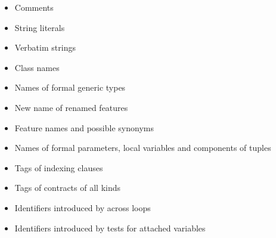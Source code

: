 \documentclass[paper=a4]{scrartcl}
\begin{document}
\begin{itemize}
\item Comments
\item String literals
\item Verbatim strings
\item Class names
\item Names of formal generic types
\item New name of renamed features
\item Feature names and possible synonyms
\item Names of formal parameters, local variables and components of tuples
\item Tags of indexing clauses
\item Tags of contracts of all kinds
\item Identifiers introduced by across loops
\item Identifiers introduced by tests for attached variables
\end{itemize}








\end{document}
